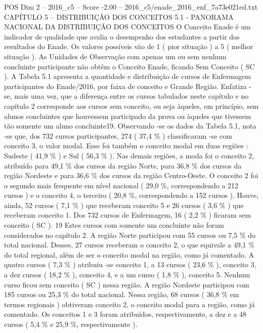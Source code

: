 \begin{textsample}{POS Dim 2 – 2016\_c5 – Score -2.00 – 2016\_c5/enade\_2016\_enf\_7a73e021ed.txt}  \label{ex:f2_pos_401}
CAPÍTULO 5 – DISTRIBUIÇÃO DOS CONCEITOS 5.1 - PANORAMA NACIONAL DA DISTRIBUIÇÃO DOS CONCEITOS O Conceito Enade é um indicador de qualidade que avalia o desempenho dos estudantes a partir dos resultados do Enade.
Os valores possíveis vão de 1 ( pior situação ) a 5 ( melhor situação ).
As Unidades de Observação com apenas um ou sem nenhum concluinte participante não obtêm o Conceito Enade, ficando Sem Conceito ( SC ).
A Tabela 5.1 apresenta a quantidade e distribuição de cursos de Enfermagem participantes do Enade/2016, por faixa de conceito e Grande Região.
Enfatiza -se, mais uma vez, que a diferença entre os cursos tabulados neste capítulo e no capítulo 2 corresponde aos cursos sem conceito, ou seja àqueles, em princípio, sem alunos concluintes que houvessem participado da prova ou àqueles que tivessem tão somente um aluno concluinte19.
Observando -se os dados da Tabela 5.1, nota -se que, dos 732 cursos participantes, 274 ( 37,4 \% ) classificaram -se com conceito 3, o valor modal.
Esse foi também o conceito modal em duas regiões : Sudeste ( 41,9 \% ) e Sul ( 56,3 \% ).
Nas demais regiões, a moda foi o conceito 2, atribuído para 49,1 \% dos cursos da região Norte, para 36,8 \% dos cursos da região Nordeste e para 36,6 \% dos cursos da região Centro-Oeste.
O conceito 2 foi o segundo mais frequente em nível nacional ( 29,0 \%, correspondendo a 212 cursos ) e o conceito 4, o terceiro ( 20,8 \%, correspondendo a 152 cursos ).
Houve, ainda, 52 cursos ( 7,1 \% ) que receberam conceito 5 e 26 cursos ( 3,6 \% ) que receberam conceito 1.
Dos 732 cursos de Enfermagem, 16 ( 2,2 \% ) ficaram sem conceito ( SC ). 19 Estes cursos com somente um concluinte não foram considerados no capítulo 2.
A região Norte participou com 55 cursos ou 7,5 \% do total nacional.
Desses, 27 cursos receberam o conceito 2, o que equivale a 49,1 \% do total regional, além de ser o conceito modal na região, como já comentado.
A quatro cursos ( 7,3 \% ) atribuiu -se conceito 1, a 13 cursos ( 23,6 \% ), conceito 3, a dez cursos ( 18,2 \% ), conceito 4, e a um curso ( 1,8 \% ), conceito 5.
Nenhum curso ficou sem conceito ( SC ) nessa região.
A região Nordeste participou com 185 cursos ou 25,3 \% do total nacional.
Nessa região, 68 cursos ( 36,8 \% em termos regionais ) obtiveram conceito 2, o conceito modal para a região, como já comentado.
Os conceitos 1 e 3 foram atribuídos, respectivamente, a dez e a 48 cursos ( 5,4 \% e 25,9 \%, respectivamente ).

\end{textsample}
